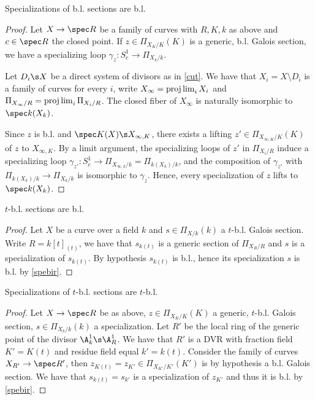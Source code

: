 \begin{lemma}
\notready\label{spebir}
	Specializations of b.l. sections are b.l.
	\begin{proof}
		Let $X\to \spec R$ be a family of curves with $R,K,k$ as above and $c\in\spec R$ the closed point. If $z\in\Pi_{X_{K}/K}(K)$ is a generic, b.l. Galois section, we have a specializing loop $\gamma_{z}:S^{1}_{c}\to\Pi_{X_{k}/k}$.

		Let $D_{i}\s X$ be a direct system of divisors as in \autoref{cut}. We have that $X_{i}=X\setminus D_{i}$ is a family of curves for every $i$, write $X_{\infty}=\projlim_{i}X_{i}$ and $\Pi_{X_{\infty}/R}=\projlim_{i}\Pi_{X_{i}/R}$. The closed fiber of $X_{\infty}$ is naturally isomorphic to $\spec k(X_{k})$.

		Since $z$ is b.l. and $\spec K(X)\s X_{\infty,K}$, there exists a lifting $z'\in\Pi_{X_{\infty,K}/K}(K)$ of $z$ to $X_{\infty,K}$. By a limit argument, the specializing loops of $z'$ in $\Pi_{X_{i}/R}$ induce a specializing loop $\gamma_{z'}:S^{1}_{c}\to \Pi_{X_{\infty,k}/k}=\Pi_{k(X_{k})/k}$, and the composition of $\gamma_{z'}$ with $\Pi_{k(X_{k})/k}\to \Pi_{X_{k}/k}$ is isomorphic to $\gamma_{z}$. Hence, every specialization of $z$ lifts to $\spec k(X_{k})$.
	\end{proof}
\end{lemma}

\begin{corollary}
\notready\label{tbb}
	 $t$-b.l. sections are b.l.
	 \begin{proof}
		Let $X$ be a curve over a field $k$ and $s\in\Pi_{X/k}(k)$ a $t$-b.l. Galois section. Write $R=k[t]_{(t)}$, we have that $s_{k(t)}$ is a generic section of $\Pi_{X_{R}/R}$ and $s$ is a specialization of $s_{k(t)}$. By hypothesis $s_{k(t)}$ is b.l., hence its specialization $s$ is b.l. by \autoref{spebir}.
	 \end{proof}
\end{corollary}

\begin{lemma}
\notready\label{spetbir}
	Specializations of $t$-b.l. sections are $t$-b.l.
	\begin{proof}
		Let $X\to \spec R$ be as above, $z\in\Pi_{X_{K}/K}(K)$ a generic, $t$-b.l. Galois section, $s\in\Pi_{X_{k}/k}(k)$ a specialization. Let $R'$ be the local ring of the generic point of the divisor $\A^{1}_{k}\s\A^{1}_{R}$. We have that $R'$ is a DVR with fraction field $K'=K(t)$ and residue field equal $k'=k(t)$. Consider the family of curves $X_{R'}\to \spec R'$, then $z_{K(t)}=z_{K'}\in \Pi_{X_{K'}/K'}(K')$ is by hypothesis a b.l. Galois section. We have that $s_{k(t)}=s_{k'}$ is a specialization of $z_{K'}$ and thus it is b.l. by \autoref{spebir}.
	\end{proof}
\end{lemma}

